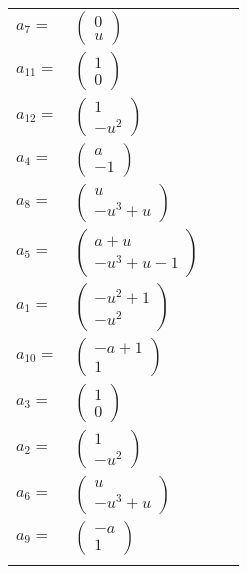 \documentclass[1p]{elsarticle_modified}
\theoremstyle{definition}
\begin{document}
\begin{tabular}{m{7pt} m{180pt} m{7pt} m{180pt} }
\flushright $a_{7}=$&$\begin{pmatrix}0\\u\end{pmatrix}$ \\
\flushright $a_{11}=$&$\begin{pmatrix}1\\0\end{pmatrix}$ \\
\flushright $a_{12}=$&$\begin{pmatrix}1\\- u^2\end{pmatrix}$ \\
\flushright $a_{4}=$&$\begin{pmatrix}a\\-1\end{pmatrix}$ \\
\flushright $a_{8}=$&$\begin{pmatrix}u\\- u^3+u\end{pmatrix}$ \\
\flushright $a_{5}=$&$\begin{pmatrix}a+u\\- u^3+u-1\end{pmatrix}$ \\
\flushright $a_{1}=$&$\begin{pmatrix}- u^2+1\\- u^2\end{pmatrix}$ \\
\flushright $a_{10}=$&$\begin{pmatrix}- a+1\\1\end{pmatrix}$ \\
\flushright $a_{3}=$&$\begin{pmatrix}1\\0\end{pmatrix}$ \\
\flushright $a_{2}=$&$\begin{pmatrix}1\\- u^2\end{pmatrix}$ \\
\flushright $a_{6}=$&$\begin{pmatrix}u\\- u^3+u\end{pmatrix}$ \\
\flushright $a_{9}=$&$\begin{pmatrix}- a\\1\end{pmatrix}$\\&\end{tabular}
\end{document}
